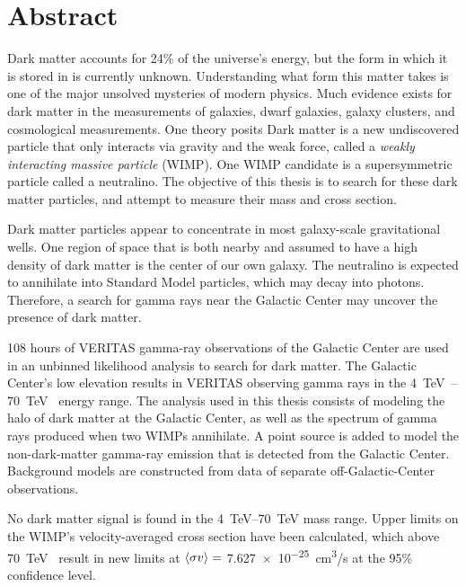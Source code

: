 \cleartooddpage[\thispagestyle{empty}]
\section*{Abstract}

Dark matter accounts for 24\% of the universe's energy, but the form in which it is stored in is currently unknown.
Understanding what form this matter takes is one of the major unsolved mysteries of modern physics.
Much evidence exists for dark matter in the measurements of galaxies, dwarf galaxies, galaxy clusters, and cosmological measurements.
One theory posits Dark matter is a new undiscovered particle that only interacts via gravity and the weak force, called a \textit{weakly interacting massive particle} (WIMP).
One WIMP candidate is a supersymmetric particle called a neutralino.
The objective of this thesis is to search for these dark matter particles, and attempt to measure their mass and cross section.

Dark matter particles appear to concentrate in most galaxy-scale gravitational wells.
One region of space that is both nearby and assumed to have a high density of dark matter is the center of our own galaxy.
The neutralino is expected to annihilate into Standard Model particles, which may decay into photons.
Therefore, a search for gamma rays near the Galactic Center may uncover the presence of dark matter.

108 hours of VERITAS gamma-ray observations of the Galactic Center are used in an unbinned likelihood analysis to search for dark matter.
The Galactic Center's low elevation results in VERITAS observing gamma rays in the \SIrange{4}{70}{\TeV{}} energy range.
The analysis used in this thesis consists of modeling the halo of dark matter at the Galactic Center, as well as the spectrum of gamma rays produced when two WIMPs annihilate.
A point source is added to model the non-dark-matter gamma-ray emission that is detected from the Galactic Center.
Background models are constructed from data of separate off-Galactic-Center observations.

No dark matter signal is found in the \SIrange{4}{70}{\TeV} mass range.
Upper limits on the WIMP's velocity-averaged cross section have been calculated, which above \SI{70}{\TeV{}} result in new limits at $\left \langle \sigma v \right \rangle =$ \SI{7.627e-25}{cm^3/s} at the 95\% confidence level.



\cleartoevenpage[\thispagestyle{plain}]
\null
